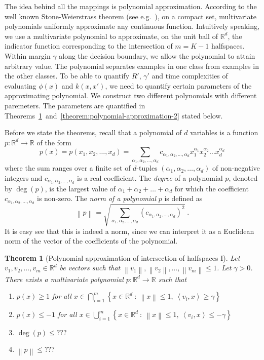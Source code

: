 \documentclass[12pt]{article}
\newtheorem{theorem}[definition]{Theorem}
\newcommand{\R}{\mathbb{R}}  %
\newcommand{\ip}[2]{\left\langle #1, #2 \right\rangle} %
\newcommand{\norm}[1]{\left\| #1 \right\|}  %
\begin{document}
The idea behind all the mappings is polynomial approximation. According to the
well known Stone-Weierstrass theorem (see
e.g.~\citep[Section~10.10]{Davidson-Donsig-2010}), on a compact set,
multivariate polynomials uniformly approximate any continuous function.
Intuitively speaking, we use a multivariate polynomial to approximate, on the
unit ball of $\R^d$, the indicator function corresponding to the intersection of
$m=K-1$ halfspaces. Within margin $\gamma$ along the decision boundary, we allow
the polynomial to attain arbitrary value. The polynomial separates examples in
one class from examples in the other classes. To be able to quantify $R'$,
$\gamma'$ and time complexities of evaluating $\phi(x)$ and $k(x,x')$, we need
to quantify certain parameters of the approximating polynomial. We construct two
different polynomials with different paremeters. The parameters are quantified
in
Theorems~\ref{theorem:polynomial-approximation-1}~and~\ref{theorem:polynomial-approximation-2}
stated below.

Before we state the theorems, recall that a polynomial of $d$ variables is a
function $p:\R^d \to \R$ of the form
$$
p(x) = p(x_1, x_2, \dots, x_d) = \sum_{\alpha_1, \alpha_2, \dots, \alpha_d} c_{\alpha_1, \alpha_2, \dots, \alpha_d} x_1^{\alpha_1} x_2^{\alpha_2} \dots x_d^{\alpha_d}
$$
where the sum ranges over a finite set of $d$-tuples $(\alpha_1, \alpha_2,
\dots, \alpha_d)$ of non-negative integers and $c_{\alpha_1, \alpha_2, \dots,
\alpha_d}$ is a real coefficient. The \emph{degree} of a polynomial $p$, denoted
by $\deg(p)$, is the largest value of $\alpha_1 + \alpha_2 + \dots + \alpha_d$
for which the coefficient $c_{\alpha_1, \alpha_2, \dots, \alpha_d}$ is non-zero.
The \emph{norm of a polynomial} $p$ is defined as
$$
\norm{p} = \sqrt{\sum_{\alpha_1, \alpha_2, \dots, \alpha_d} \left(c_{\alpha_1, \alpha_2, \dots, \alpha_d} \right)^2 } \; .
$$
It is easy see that this is indeed a norm, since we can interpret it as a
Euclidean norm of the vector of the coefficients of the polynomial.

\begin{theorem}[Polynomial approximation of intersection of halfspaces I]
\label{theorem:polynomial-approximation-1}
Let $v_1, v_2, \dots, v_m \in \R^d$ be vectors such that $\norm{v_1},
\norm{v_2}, \dots, \norm{v_m} \le 1$. Let $\gamma > 0$. There exists a
multivariate polynomial $p:\R^d \to \R$ such that
\begin{enumerate}
\item $p(x) \ge 1$ for all $\displaystyle x \in \bigcap_{i=1}^m \left\{ x \in \R^d ~:~ \norm{x} \le 1, \ \ip{v_i}{x} \ge \gamma \right\}$
\item $p(x) \le -1$ for all $\displaystyle x \in \bigcup_{i=1}^m \left\{ x \in \R^d ~:~ \norm{x} \le 1, \ \ip{v_i}{x} \le - \gamma \right\}$
\item $\deg(p) \le ???$
\item $\norm{p} \le ???$
\end{enumerate}
\end{theorem}
\end{document}

